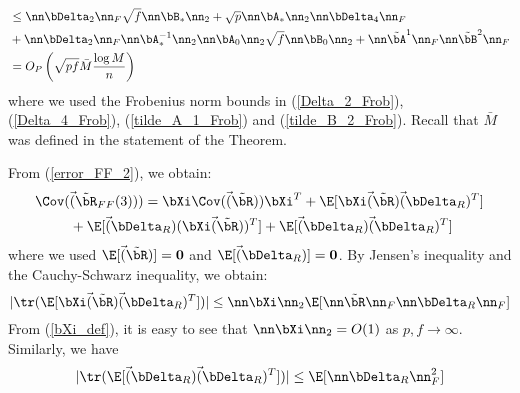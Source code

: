 \begin{IEEEproof}
\begin{align}
		&\leq \nn \bDelta_2 \nn_F \sqrt{f} \nn \bB_*\nn_2 + \sqrt{p} \nn \bA_*\nn_2 \nn \bDelta_4 \nn_F \nonumber \\
		&+ \nn\bDelta_2\nn_F \nn \bA_*^{-1}\nn_2 \nn\bA_0 \nn_2 \sqrt{f} \nn \bB_0 \nn_2 + \nn\tilde{\bA}^1\nn_F \nn\tilde{\bB}^2\nn_F \nonumber \\
		&= O_P\left( \sqrt{pf} \bar{M} \frac{\log M}{n} \right) \label{Delta_R_Frob}
\end{align}
where we used the Frobenius norm bounds in (\ref{Delta_2_Frob}), (\ref{Delta_4_Frob}), (\ref{tilde_A_1_Frob}) and (\ref{tilde_B_2_Frob}). Recall that $\bar{M}$ was defined in the statement of the Theorem.

From (\ref{error_FF_2}), we obtain:
\begin{align}
	\Cov(& \vec(\tilde{\bR}_{FF}(3))) = \bXi \Cov(\vec(\tilde{\bR})) \bXi^T + \E[\bXi \vec(\tilde{\bR}) \vec(\bDelta_R)^T] \nonumber \\
		&+ \E[\vec(\bDelta_R) (\bXi \vec(\tilde{\bR}))^T] + \E[\vec(\bDelta_R) \vec(\bDelta_R)^T] \label{cov_error_FF}
\end{align}
where we used $\E[\vec(\tilde{\bR})] = \mathbf{0}$ and $\E[\vec(\bDelta_R)] = \mathbf{0}$.
By Jensen's inequality and the Cauchy-Schwarz inequality, we obtain:
\begin{equation}
	|\tr(\E[\bXi \vec(\tilde{\bR}) \vec(\bDelta_R)^T])| \leq \nn \bXi \nn_2 \E[ \nn \tilde{\bR} \nn_F \nn \bDelta_R \nn_F ] \label{term_1_bound}
\end{equation}
From (\ref{bXi_def}), it is easy to see that $\nn \bXi \nn_2=O(1)$ as $p,f\to\infty$. Similarly, we have
\begin{equation} \label{term_2_bound}
	|\tr(\E[\vec(\bDelta_R) \vec(\bDelta_R)^T])| \leq \E[ \nn \bDelta_R \nn_F^2 ]
\end{equation}



\end{IEEEproof}
